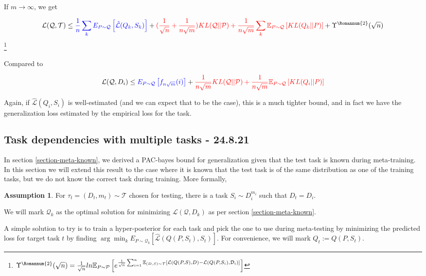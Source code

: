 \documentclass[letterpaper]{article}
\theoremstyle{definition}
\newtheorem{assumption}{Assumption}
\begin{document}
If $m\rightarrow\infty$, we get

$$\mathcal{L}(\mathcal{Q}, \mathcal{T}) \leq \textcolor{blue}{\frac{1}{n}\sum_k E_{P\sim \mathcal{Q}} \left [ \hat{\mathcal{L}}(Q_k,S_k) \right ]}+ \textcolor{red}{(\frac{1}{\sqrt{n}}+\frac{1}{n\sqrt{m}})KL(\mathcal{Q}||\mathcal{P})+\frac{1}{n\sqrt{m}}\sum_k \mathbb{E}_{P\sim \mathcal{Q}} \left [KL(Q_k||P) \right ]} + \Upsilon^{\text{\Romannum{2}}}(\sqrt{n})$$
\footnote{$\Upsilon^{\text{\Romannum{2}}}(\sqrt{n})=\frac{1}{\sqrt{n}}ln \mathbb{E}_{P\sim \mathcal{P}} \left [e^{\frac{1}{\sqrt{n}}\sum_{i=1}^{n}\mathbb{E}_{(D,S)\sim \mathcal{T}}\left [\mathcal{L}(Q(P,S),D)- \mathcal{L}(Q(P, S_i), \mathcal{D}_i)\right ]} \right ]$}

Compared to 

$$\mathcal{L}(\mathcal{Q}, D_i)\leq \textcolor{blue}{E_{P\sim \mathcal{Q}}  \left [ f_{n\sqrt{m}}(i)\right ]} + \textcolor{red}{\frac{1}{n\sqrt{m}}KL(\mathcal{Q}||\mathcal{P})+\frac{1}{n\sqrt{m}}\mathbb{E}_{P\sim \mathcal{Q}} \left [KL(Q_i||P)\right ]} $$

Again, if $\hat{\mathcal{L}}(Q_i,S_i)$ is well-estimated (and we can expect that to be the case), this is a much tighter bound, and in fact we have the generalization loss estimated by the empirical loss for the task.


\subsection{Task dependencies with multiple tasks - 24.8.21} \label{sec:bayes:multi}

In section \ref{section-meta-known}, we derived a PAC-bayes bound for generalization given that the test task is known during meta-training. In this section we will extend this result to the case where it is known that the test task is of the same distribution as one of the training tasks, but we do not know the correct task during training. More formally, 

\begin{assumption} \label{assumption-multitask}
	For $\tau_t=(D_t, m_t)\sim \mathcal{T}$ chosen for testing, there is a task $S_i\sim D_i^{m_i}$ such that $D_t=D_i$.
\end{assumption}

We will mark $\mathcal{Q}_k$ as the optimal solution for minimizing $\mathcal{L}(\mathcal{Q}, D_k)$ as per section \ref{section-meta-known}.

A simple solution to try is to train a hyper-posterior for each task and pick the one to use during meta-testing by minimizing the predicted loss for target task $t$ by finding $\arg\min_{k}E_{P\sim\mathcal{Q}_k}\left [\hat{\mathcal{L}}(Q(P,S_t), S_t)\right ]$.
For convenience, we will mark $Q_t:=Q(P,S_t)$.
\end{document}
